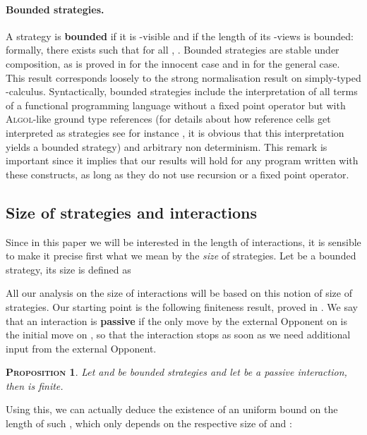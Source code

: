 \documentclass{article}
\newtheorem{proposition}{\textsc{Proposition}}
\begin{document}
\paragraph{Bounded strategies.} A strategy  is \textbf{bounded} if it is -visible and if the length of its -views is bounded: formally, there exists
 such that for all , . Bounded strategies are stable under composition, as is proved in \cite{totality} for the innocent case
and in \cite{phd} for the general case. This result corresponds loosely to the strong normalisation result on simply-typed -calculus.
Syntactically, bounded strategies include the interpretation of all terms of a functional
programming language without a fixed point operator but with \textsc{Algol}-like ground type references (for details about how reference cells get
interpreted as strategies see for instance \cite{abramsky-mccusker:active-algol}, it is obvious that this interpretation yields a bounded strategy) and arbitrary non determinism. This remark
is important since it implies that our results will hold for any program written with these constructs, as long as they do not use recursion or a fixed point
operator. 

\subsection{Size of strategies and interactions}

Since in this paper we will be interested in the length of interactions, it is sensible to make it precise first what we mean by the \emph{size} of strategies. 
Let  be a bounded strategy, its size is defined as

All our analysis on the size of interactions will be based on this notion of size of strategies. Our starting point is the following finiteness result, 
proved in \cite{totality}. We say that an interaction  is \textbf{passive} if the only move by the external Opponent on 
is the initial move on , so that the interaction stops as soon as we need additional input from the external Opponent. 

\begin{proposition}
Let  and  be bounded strategies and let  be a passive interaction, then  is finite.
\label{finiteness}
\end{proposition}

Using this, we can actually deduce the existence of an uniform bound on the length of such , which only depends
on the respective size of  and :
\end{document}
